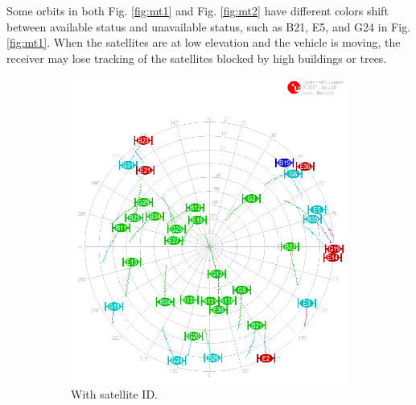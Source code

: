 \documentclass[letterpaper, 10 pt,onecolumn]{article}
\begin{document}
	Some orbits in both Fig. \ref{fig:mt1} and Fig. \ref{fig:mt2} have different colors shift between available status and unavailable status, such as B21, E5, and G24 in Fig. \ref{fig:mt1}. When the satellites are at low elevation and the vehicle is moving, the receiver may lose tracking of the satellites blocked by high buildings or trees. 
	\begin{figure}[H]
		\centering
		\begin{subfigure}{.45\textwidth}
			\includegraphics[width=\linewidth]{../Moving_SingleBand/skyplot.png}
			\caption{With satellite ID.}
			\label{fig:mt1_sky}
		\end{subfigure}%
		\begin{subfigure}{.45\textwidth}

\end{subfigure}
\end{figure}
\end{document}
